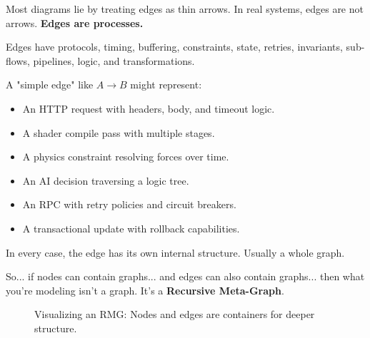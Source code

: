 Most diagrams lie by treating edges as thin arrows. In real systems, edges are not arrows. \textbf{Edges are processes.}

Edges have protocols, timing, buffering, constraints, state, retries, invariants, sub-flows, pipelines, logic, and transformations.

A "simple edge" like $A \rightarrow B$ might represent:
\begin{itemize}
    \item An HTTP request with headers, body, and timeout logic.
    \item A shader compile pass with multiple stages.
    \item A physics constraint resolving forces over time.
    \item An AI decision traversing a logic tree.
    \item An RPC with retry policies and circuit breakers.
    \item A transactional update with rollback capabilities.
\end{itemize}

In every case, the edge has its own internal structure. Usually a whole graph.

So... if nodes can contain graphs... and edges can also contain graphs... then what you're modeling isn't a graph. It's a \textbf{Recursive Meta-Graph}.

\begin{figure}[h]
    \centering
    \caption{Visualizing an RMG: Nodes and edges are containers for deeper structure.}
    \label{fig:rmg_concept}
\end{figure}

